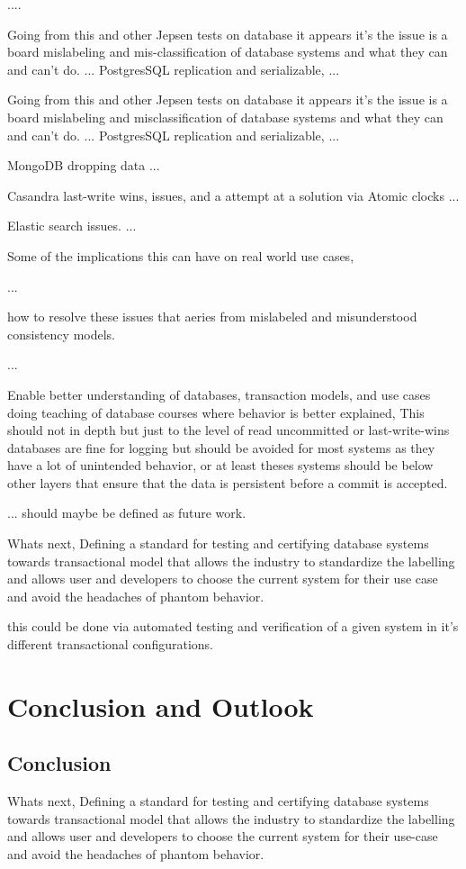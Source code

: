 \documentclass[a4paper,10pt,titlepage]{report}
\begin{document}
    ....

    Going from this and other Jepsen tests on database it appears it's the issue is a board mislabeling and mis-classification of database systems and what they can and can't do.
    ...
    PostgresSQL replication and serializable,
    ...

    Going from this and other Jepsen tests on database it appears it's the issue is a board mislabeling and misclassification of database systems and what they can and can't do.
    ...
    PostgresSQL replication and serializable,
    ...

    MongoDB dropping data
    ...

    Casandra last-write wins, issues, and a attempt at a solution via Atomic clocks
    ...

    Elastic search issues.
    ...

    Some of the implications this can have on real world use cases,

    ...

    how to resolve these issues that aeries from mislabeled and misunderstood consistency models.

    ...

    Enable better understanding of databases, transaction models, and use cases doing teaching of database courses where behavior is better explained, This should not in depth but just to the level of read uncommitted or last-write-wins databases are fine for logging but should be avoided for most systems as they have a lot of unintended behavior, or at least theses systems should be below other layers that ensure that the data is persistent before a commit is accepted.

    ... should maybe be defined as future work.

    Whats next, Defining a standard for testing and certifying database systems towards transactional model that allows the industry to standardize the labelling and allows user and developers to choose the current system for their use case and avoid the headaches of phantom behavior.

    this could be done via automated testing and verification of a given system in it's different transactional configurations.


    \chapter{Conclusion and Outlook}
    \section*{Conclusion}
    Whats next, Defining a standard for testing and certifying database systems towards transactional model that allows the industry to standardize the labelling and allows user and developers to choose the current system for their use-case and avoid the headaches of phantom behavior.
\end{document}

